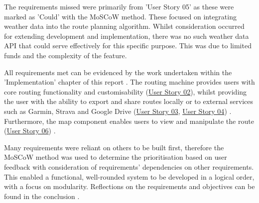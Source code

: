 The requirements missed were primarily from 'User Story 05'  as these were marked as 'Could' with the MoSCoW method. These focused on integrating weather data into the route planning algorithm. Whilst consideration occurred for extending development and implementation, there was no such weather data API that could serve effectively for this specific purpose. This was due to limited funds and the complexity of the feature.

All requirements met can be evidenced by the work undertaken within the 'Implementation' chapter of this report . The routing machine provides users with core routing functionality and customisability (\hyperref[tab:user-story-02]{User Story 02}), whilst providing the user with the ability to export and share routes locally or to external services such as Garmin, Strava and Google Drive (\hyperref[tab:user-story-03]{User Story 03}, \hyperref[tab:user-story-04]{User Story 04}) . Furthermore, the map component enables users to view and manipulate the route (\hyperref[tab:user-story-06]{User Story 06}) .

Many requirements were reliant on others to be built first, therefore the MoSCoW method was used to determine the prioritisation based on user feedback with consideration of requirements' dependencies on other requirements. This enabled a functional, well-rounded system to be developed in a logical order, with a focus on modularity. Reflections on the requirements and objectives can be found in the conclusion .

